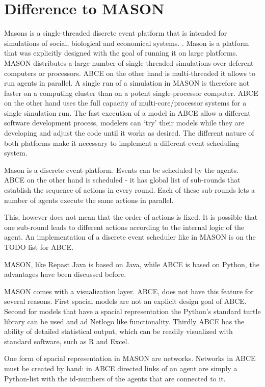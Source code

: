 \documentclass[letterpaper,10pt,english]{sphinxmanual}
\begin{document}
\section{Difference to MASON}
\label{introduction:difference-to-mason}
Masons is a single-threaded discrete event platform that is intended
for simulations of social, biological and economical systems.
\cite{Luke}. Mason is a platform that was explicitly designed with the goal of
running it on large platforms. MASON distributes a large number
of single threaded simulations over deferent computers or processors.
ABCE on the other hand is multi-threaded it
allows to run agents in parallel. A single run of a simulation
in MASON is therefore not faster on a computing cluster than
on a potent single-processor computer. ABCE on the other hand
uses the full capacity of multi-core/processor systems for
a single simulation run. The fast
execution of a model in ABCE allow a different software
development process, modelers can `try' their models while they
are developing and adjust the code until it works as desired.
The different nature of both
platforms make it necessary to implement a different event
scheduling system.

Mason is a discrete event platform. Events can be scheduled by the
agents. ABCE on the other hand is scheduled -
it has global list of sub-rounds that establish the sequence
of actions in every round. Each of these sub-rounds lets a
number of agents execute the same actions in parallel.

This, however does not mean that the order of actions is
fixed. It is possible that one sub-round leads to different
actions according to the internal logic of the agent. An
implementation of a discrete event scheduler like in MASON
is on the TODO list for ABCE.

MASON, like Repast Java is based on Java, while ABCE is
based on Python, the advantages have been discussed before.

MASON comes with a visualization layer. ABCE, does not have
this feature for several reasons. First spacial models are
not an explicit design goal of ABCE. Second for models
that have a spacial representation the Python's standard
turtle library can be used and ad Netlogo like functionality.
Thirdly ABCE has the ability of detailed statistical output,
which can be readily visualized with standard software,
such as R and Excel.

One form of spacial representation in MASON are networks.
Networks in ABCE must be created by hand: in ABCE directed links
of an agent are simply a Python-list with the id-numbers of the
agents that are connected to it.
\end{document}
